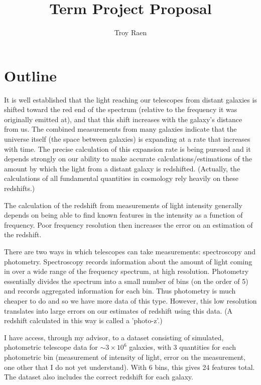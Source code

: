 \documentclass[13pt]{amsart}
\title{Term Project Proposal}
\author{Troy Raen}
\begin{document}
\maketitle



\section{Outline}

It is well established that the light reaching our telescopes from distant galaxies is shifted toward the red end of the spectrum (relative to the frequency it was originally emitted at), and that this shift increases with the galaxy's distance from us. The combined measurements from many galaxies indicate that the universe itself (the space between galaxies) is expanding at a rate that increases with time. The precise calculation of this expansion rate is being pursued and it depends strongly on our ability to make accurate calculations/estimations of the amount by which the light from a distant galaxy is redshifted. (Actually, the calculations of all fundamental quantities in cosmology rely heavily on these redshifts.)

The calculation of the redshift from measurements of light intensity generally depends on being able to find known features in the intensity as a function of frequency. Poor frequency resolution then increases the error on an estimation of the redshift.

There are two ways in which telescopes can take measurements: spectroscopy and photometry. Spectroscopy records information about the amount of light coming in over a wide range of the frequency spectrum, at high resolution. Photometry essentially divides the spectrum into a small number of bins (on the order of 5) and records aggregated information for each bin. Thus photometry is much cheaper to do and so we have more data of this type. However, this low resolution translates into large errors on our estimates of redshift using this data. (A redshift calculated in this way is called a 'photo-z'.)

I have access, through my advisor, to a dataset consisting of simulated, photometric telescope data for $\sim3 \times 10^{6}$ galaxies, with 3 quantities for each photometric bin (measurement of intensity of light, error on the measurement, one other that I do not yet understand). With 6 bins, this gives 24 features total. The dataset also includes the correct redshift for each galaxy.
\end{document}
